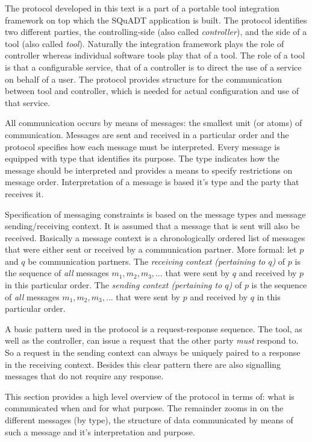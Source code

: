 \documentclass{article}
\newcommand{\squadt}{SQuADT\xspace}
\begin{document}
  The protocol developed in this text is a part of a portable tool integration
  framework on top which the \squadt application is built. The protocol
  identifies two different parties, the controlling-side (also called
  \textit{controller}), and the side of a tool (also called \textit{tool}).
  Naturally the integration framework plays the role of controller whereas
  individual software tools play that of a tool.  The role of a tool is that a
  configurable service, that of a controller is to direct the use of a service
  on behalf of a user. The protocol provides structure for the communication
  between tool and controller, which is needed for actual configuration and use
  of that service.

  All communication occurs by means of messages: the smallest unit (or atoms)
  of communication.  Messages are sent and received in a particular order and
  the protocol specifies how each message must be interpreted. Every message is
  equipped with type that identifies its purpose.  The type indicates how the
  message should be interpreted and provides a means to specify restrictions on
  message order. Interpretation of a message is based it's type and the party
  that receives it.

  Specification of messaging constraints is based on the message types and
  message sending/receiving context. It is assumed that a message that is sent
  will also be received.  Basically a message context is a chronologically
  ordered list of messages that were either sent or received by a communication
  partner.  More formal: let $p$ and $q$ be communication partners. The
  \textit{receiving context (pertaining to $q$)} of $p$ is the sequence of
  \emph{all} messages $m_{1}, m_{2}, m_{3}, \ldots$ that were sent by $q$ and
  received by $p$ in this particular order.  The \textit{sending context
  (pertaining to $q$)} of $p$ is the sequence of \emph{all} messages $m_{1},
  m_{2}, m_{3}, \ldots$ that were sent by $p$ and received by $q$ in this
  particular order.

  A basic pattern used in the protocol is a request-response sequence. The
  tool, as well as the controller, can issue a request that the other party
  \emph{must} respond to. So a request in the sending context can always be
  uniquely paired to a response in the receiving context. Besides this clear
  pattern there are also signalling messages that do not require any response.

  This section provides a high level overview of the protocol in terms of: what
  is communicated when and for what purpose. The remainder zooms in on the
  different messages (by type), the structure of data communicated by means of
  such a message and it's interpretation and purpose.
\end{document}
